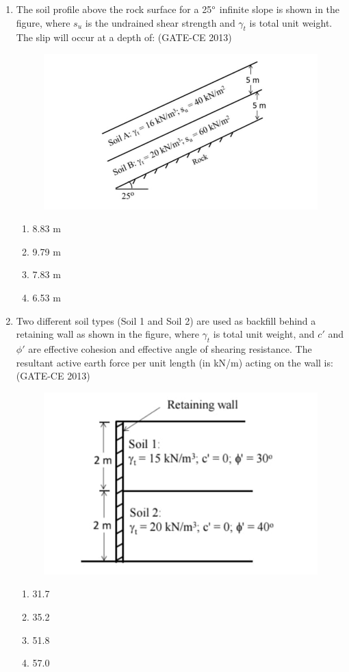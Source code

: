 \documentclass[journal,12pt,onecolumn]{article}
\theoremstyle{remark}
\begin{document}
\begin{enumerate}
    \item The soil profile above the rock surface for a 25$\degree$ infinite slope is shown in the figure, where $s_u$ is the undrained shear strength and $\gamma_t$ is total unit weight. The slip will occur at a depth of: (GATE-CE 2013)
    \begin{figure}[H]
    \centering
    \includegraphics[width=0.7\columnwidth]{figs/image37.jpg}  
    \caption{}
    \label{fig:7}
    \end{figure}
    \begin{multicols}{4}
    \begin{enumerate}
        \item 8.83 m 
        \item 9.79 m 
        \item 7.83 m 
        \item 6.53 m
    \end{enumerate}
    \end{multicols}
    
    \item Two different soil types (Soil 1 and Soil 2) are used as backfill behind a retaining wall as shown in the figure, where $\gamma_t$ is total unit weight, and $c'$ and $\phi'$ are effective cohesion and effective angle of shearing resistance. The resultant active earth force per unit length (in kN/m) acting on the wall is: (GATE-CE 2013)
    \begin{figure}[H]
    \centering
    \includegraphics[width=0.7\columnwidth]{figs/image38.jpg}  
    \caption{}
    \label{fig:8}
    \end{figure}
    \begin{multicols}{4}
    \begin{enumerate}
        \item 31.7 
        \item 35.2 
        \item 51.8 
        \item 57.0
    \end{enumerate}
    \end{multicols}
    

\end{enumerate}
\end{document}
